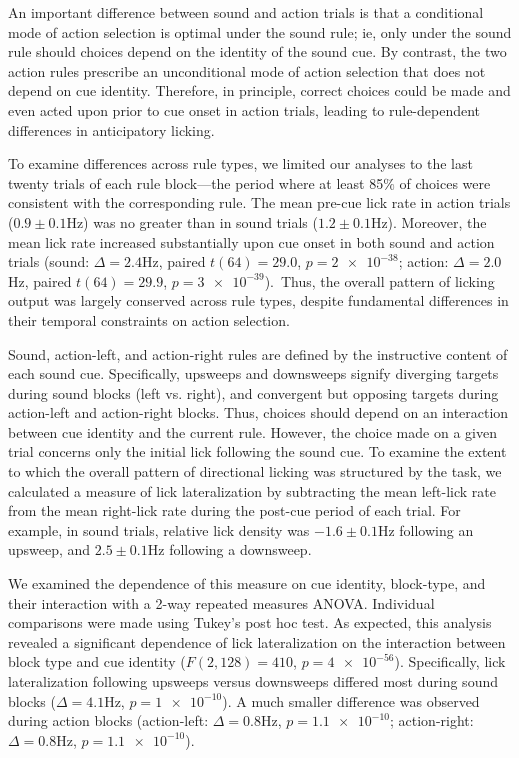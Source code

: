 An important difference between sound and action trials is that a conditional mode of action selection is optimal under the sound rule; ie, only under the sound rule should choices depend on the identity of the sound cue. By contrast, the two action rules prescribe an unconditional mode of action selection that does not depend on cue identity. Therefore, in principle, correct choices could be made and even acted upon prior to cue onset in action trials, leading to rule-dependent differences in anticipatory licking.

To examine differences across rule types, we limited our analyses to the last twenty trials of each rule block---the period where at least 85$\%$  of choices were consistent with the corresponding rule. The mean pre-cue lick rate in action trials ($0.9 \pm 0.1$Hz) was no greater than in sound trials ($1.2 \pm 0.1$Hz). Moreover, the mean lick rate increased substantially upon cue onset in both sound and action trials (sound: $\Delta=2.4$Hz, paired $t(64) =29.0$, $p=\num{2e-38}$; action: $\Delta=2.0$ Hz, paired $t(64)=29.9$, $p=\num{3e-39}$).\ Thus, the overall pattern of licking output was largely conserved across rule types, despite fundamental differences in their temporal constraints on action selection.

Sound, action-left, and action-right rules are defined by the instructive content of each sound cue. Specifically, upsweeps and downsweeps signify diverging targets during sound blocks (left vs. right), and convergent but opposing targets during action-left and action-right blocks. Thus, choices should depend on an interaction between cue identity and the current rule. However, the choice made on a given trial concerns only the initial lick following the sound cue. To examine the extent to which the overall pattern of directional licking was structured by the task, we calculated a measure of lick lateralization by subtracting the mean left-lick rate from the mean right-lick rate during the post-cue period of each trial. For example, in sound trials, relative lick density was $-1.6 \pm 0.1$Hz following an upsweep, and $2.5 \pm 0.1$Hz following a downsweep.

We examined the dependence of this measure on cue identity, block-type, and their interaction with a 2-way repeated measures ANOVA. Individual comparisons were made using Tukey’s post hoc test. As expected, this analysis revealed a significant dependence of lick lateralization on the interaction between block type and cue identity ($F(2,128)=410$, $p=\num{4e-56}$). Specifically, lick lateralization following upsweeps versus downsweeps differed most during sound blocks ($\Delta=4.1$Hz, $p=\num{1e-10}$). A much smaller difference was observed during action blocks (action-left: $\Delta=0.8$Hz, $p=\num{1.1e-10}$; action-right: $\Delta=0.8$Hz, $p=\num{1.1e-10}$). 

